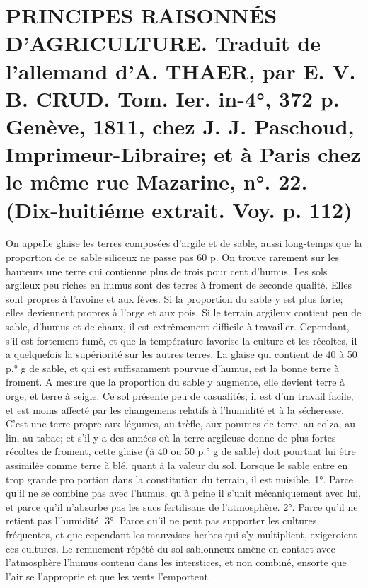 \setcounter{page}{117}
\section{PRINCIPES RAISONNÉS D'AGRICULTURE. Traduit de l'allemand d'A. THAER, par E. V. B. CRUD. Tom. Ier. in-4°, 372 p. Genève, 1811, chez J. J. Paschoud, Imprimeur-Libraire; et à Paris chez le même rue Mazarine, n°. 22. \large{(Dix-huitiéme extrait. Voy. p. 112)}}
On appelle glaise les terres composées d’argile et de sable, aussi long-temps que la proportion de ce sable siliceux ne passe pas 60 p. %
On trouve rarement sur les hauteurs une terre qui contienne plus de trois pour cent d’humus. Les sols argileux peu riches en\setcounter{page}{118} humus sont des terres à froment de seconde qualité. Elles sont propres à l'avoine et aux fèves. Si la proportion du sable y est plus forte; elles deviennent propres à l'orge et aux pois.
Si le terrain argileux contient peu de sable, d'humus et de chaux, il est extrêmement difficile à travailler. Cependant, s'il est fortement fumé, et que la température favorise la culture et les récoltes, il a quelquefois la supériorité sur les autres terres.
La glaise qui contient de 40 à 50 p.° g de sable, et qui est suffisamment pourvue d'humus, est la bonne terre à froment. A mesure que la proportion du sable y augmente, elle devient terre à orge, et terre à seigle. Ce sol présente peu de casualités; il est d'un travail facile, et est moins affecté par les changemens relatifs à l'humidité et à la sécheresse. C'est une terre propre aux légumes, au trèfle, aux pommes de terre, au colza, au lin, au tabac; et s'il y a des années où la terre argileuse donne de plus fortes récoltes de froment, cette glaise (à 40 ou 50 p.° g de sable) doit pourtant lui être assimilée comme terre à blé, quant à la valeur du sol.
Lorsque le sable entre en trop grande pro\setcounter{page}{119} portion dans la constitution du terrain, il est nuisible.
1°. Parce qu'il ne se combine pas avec l'humus, qu'à peine il s'unit mécaniquement avec lui, et parce qu'il n'absorbe pas les sucs fertilisans de l'atmosphère.
2°. Parce qu'il ne retient pas l'humidité.
3°. Parce qu'il ne peut pas supporter les cultures fréquentes, et que cependant les mauvaises herbes qui s'y multiplient, exigeroient ces cultures. Le remuement répété du sol sablonneux amène en contact avec l'atmosphère l'humus contenu dans les interstices, et non combiné, ensorte que l'air se l'approprie et que les vents l'emportent.
